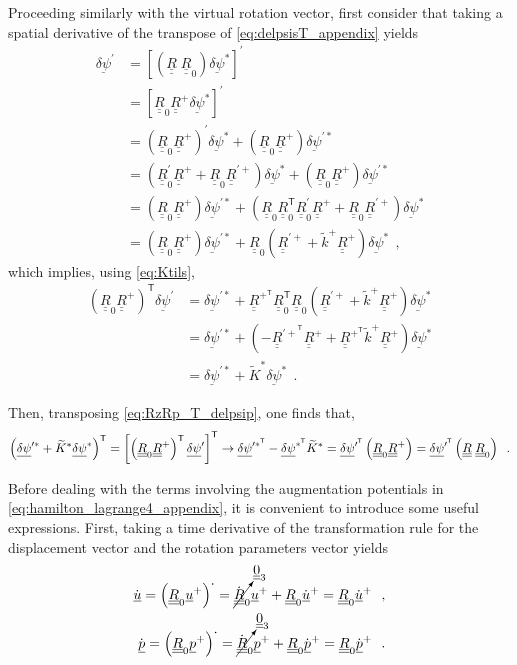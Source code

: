 \documentclass[12pt,a4paper,oneside,english]{abntex2} %
\newcommand{\vect}[1]{\underline{#1}}
\def\tens#1{\underline{\underline{#1}}}
\def\til#1{\widetilde{#1}}
\def\lb{\left[}
\def\rb{\right]}
\def\lp{\left(}
\def\rp{\right)}
\def\T{\mathsf{T}}
\def\zthree{\tens{0}_3}
\def\dotout{^{\boldsymbol{\cdot}}}
\def\R{\tens{R}}
\def\Rp{\R^+}
\def\RpT{\R^{+^\T}}
\def\Rpprime{\R^{\prime +}}
\def\RpprimeT{\R^{{\prime +}^\T}}
\def\Rz{\R_0}
\def\Rzp{\R^{\prime}_0}
\def\RzT{\R^\T_0}
\def\Rzdot{\dot{\R}_0}
\def\u{\vect{u}}
\def\uplus{\u^{+}}
\def\udot{\dot{\u}}
\def\updot{\dot{\u}^{+}}
\def\ktil{\til{k}}
\def\ktilp{\ktil^{+}}
\def\Ktil{\til{K}}
\def\Ktils{\Ktil^{*}}
\def\p{\vect{p}}
\def\pdot{\dot{\p}}
\def\pplus{\p^{+}}
\def\ppdot{\pdot^{+}}
\def\delpsi{\vect{\delta\psi}}
\def\delpsip{\delpsi^{\prime}}
\def\delpsipT{\delpsi^{\prime^\T}}
\def\delpsis{\delpsi^*}
\def\delpsisT{\delpsi^{*^\T}}
\def\delpsips{\delpsi^{\prime*}}
\def\delpsipsT{\delpsi^{\prime*^\T}}
\def\RRz{\lp\R\;\Rz\rp}
\begin{document}
\begin{apendicesenv}
Proceeding similarly with the virtual rotation vector, first consider that taking a spatial derivative of the transpose of \cref{eq:delpsisT_appendix} yields
\begin{align}
    \delpsip &=
    \lb\RRz\delpsis\rb^\prime
    \nonumber 
    \\
    &=
    \lb\Rz\Rp\delpsis\rb^\prime
    \nonumber 
    \\
    &= \lp\Rz\Rp\rp^\prime\delpsis + \lp\Rz\Rp\rp\delpsips
    \nonumber 
    \\
    &= \lp\Rzp\Rp+\Rz\Rpprime\rp\delpsis + \lp\Rz\Rp\rp\delpsips
    \nonumber 
    \\
    &= \lp\Rz\Rp\rp\delpsips + \lp\Rz\RzT\Rzp\Rp+\Rz\Rpprime\rp\delpsis 
    \nonumber 
    \\
    &= \lp\Rz\Rp\rp\delpsips + \Rz\lp\Rpprime+\ktilp\Rp\rp\delpsis \ \ ,
    \label{eq:delpsips_appendix}
\end{align}
which implies, using \cref{eq:Ktils},
\begin{align}
    \lp\Rz\Rp\rp^\T\delpsip &=
    \delpsips + \RpT\RzT\Rz\lp\Rpprime+\ktilp\Rp\rp\delpsis 
    \nonumber 
    \\
    &= \delpsips + \lp-\RpprimeT\Rp+\RpT\ktilp\Rp\rp \delpsis
    \nonumber 
    \\
    &= \delpsips + \Ktils\delpsis \ \ .
    \label{eq:RzRp_T_delpsip}
\end{align}

Then, transposing \cref{eq:RzRp_T_delpsip}, one finds that,
\begin{align}
    \scalebox{0.95}{$\displaystyle \lp\delpsips+\Ktils\delpsis\rp^\T = \lb \lp\Rz\Rp\rp^\T\delpsip \rb^\T
    \rightarrow
    \delpsipsT -\delpsisT\Ktils = \delpsipT\lp\Rz\Rp\rp = \delpsipT\RRz$} \ \ .
    \label{eq:delpsips_plus_Ktilsdelpsis_T}
\end{align}

Before dealing with the terms involving the augmentation potentials in \cref{eq:hamilton_lagrange4_appendix}, it is convenient to introduce some useful expressions. First, taking a time derivative of the transformation rule for the displacement vector and the rotation parameters vector yields
\begin{align}
    \udot = \lp\Rz\uplus\rp\dotout = \cancelto{\zthree}{\Rzdot}\uplus + \Rz\updot = \Rz\updot \ \ ,
    \label{eq:udot_appendix}
    \\
    \pdot = \lp\Rz\pplus\rp\dotout
    = \cancelto{\zthree}{\Rzdot}\pplus + \Rz\ppdot = \Rz\ppdot \ \ .
    \label{eq:pdot_appendix}
\end{align}


\end{apendicesenv}
\end{document}
